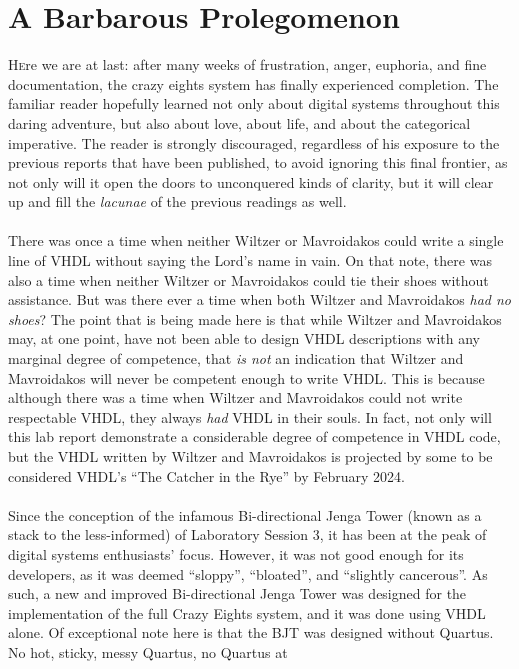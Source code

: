 \documentclass[12pt]{report}
\begin{document}
\chapter*{A Barbarous Prolegomenon}
\lettrine{H}ere we are at last: after many weeks of frustration, anger, euphoria, and fine
documentation, the crazy eights system has finally experienced completion. The familiar reader
hopefully learned not only about digital systems throughout this daring adventure, but also about
love, about life, and about the categorical imperative. The reader is strongly discouraged,
regardless of his exposure to the previous reports that have been published, to avoid ignoring this
final frontier, as not only will it open the doors to unconquered kinds of clarity, but it will clear up
and fill the \textit{lacunae} of the previous readings as well.\\\\
There was once a time when neither Wiltzer or Mavroidakos could write a single line of VHDL without
saying the Lord's name in vain. On that note, there was also a time when neither Wiltzer or
Mavroidakos could tie their shoes without assistance. But was there ever a time when both Wiltzer
and Mavroidakos \textit{had no shoes}? The point that is being made here is that while Wiltzer and
Mavroidakos may, at one point, have not been able to design VHDL descriptions with any marginal
degree of competence, that \textit{is not} an indication that Wiltzer and Mavroidakos will never be
competent enough to write VHDL. This is because although there was a time when Wiltzer and
Mavroidakos could not write respectable VHDL, they always \textit{had} VHDL in their souls. In fact,
not only will this lab report demonstrate a considerable
degree of competence in VHDL code, but the VHDL written by Wiltzer and Mavroidakos is projected by
some to be considered VHDL's ``The Catcher in the Rye'' by February 2024.\\\\
Since the conception of the infamous Bi-directional Jenga Tower (known as a stack to the
less-informed) of Laboratory Session 3, it has been at the peak of digital systems enthusiasts'
focus. However, it was not good enough for its developers, as it was deemed ``sloppy'', ``bloated'',
and ``slightly cancerous''. As such, a new and improved Bi-directional Jenga Tower was designed for
the implementation of the full Crazy Eights system, and it was done using VHDL alone. Of exceptional
note here is that the BJT was designed without Quartus. No hot, sticky, messy Quartus, no Quartus at
\end{document}
